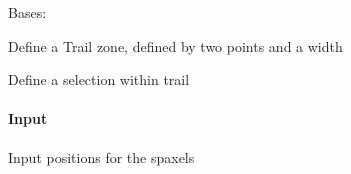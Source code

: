 \documentclass[letterpaper,10pt,english]{sphinxmanual}
\begin{document}
\begin{fulllineitems}
\label{\detokenize{api/pymusepipe:pymusepipe.util_image.TrailZone}}
\pysigstartsignatures
{}
\pysigstopsignatures
\sphinxAtStartPar
Bases: {\hyperref[\detokenize{api/pymusepipe:pymusepipe.util_image.SelectionZone}]{}}

\sphinxAtStartPar
Define a Trail zone, defined by
two points and a width

\begin{fulllineitems}
\label{\detokenize{api/pymusepipe:pymusepipe.util_image.TrailZone.select}}
\pysigstartsignatures
{}
\pysigstopsignatures
\sphinxAtStartPar
Define a selection within trail


\paragraph{Input}
\label{\detokenize{api/pymusepipe:id139}}\begin{description}
\sphinxAtStartPar
Input positions for the spaxels

\end{description}

\end{fulllineitems}


\end{fulllineitems}

\end{document}
